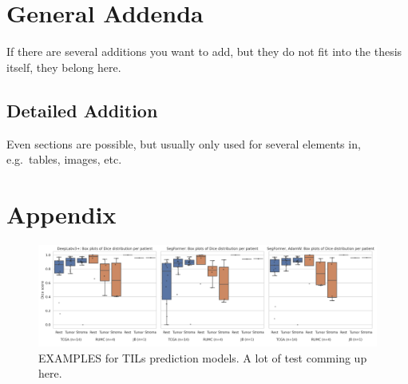 \chapter{General Addenda}

If there are several additions you want to add, but they do not fit into the thesis itself, they belong here.

\section{Detailed Addition}

Even sections are possible, but usually only used for several elements in, e.g.\ tables, images, etc.
\chapter{Appendix}
\begin{figure}
\includegraphics[width=\linewidth]{figures/tissue/dices_patients.png}
\caption{EXAMPLES for TILs prediction models. A lot of test comming up here.}
\label{fig:figure3}
\end{figure}

